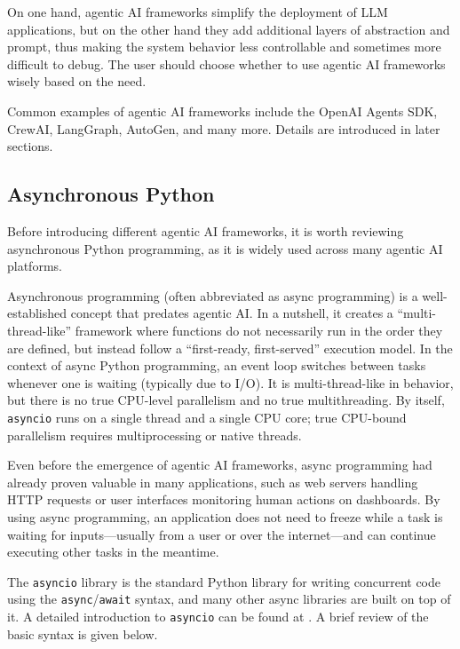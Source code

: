 On one hand, agentic AI frameworks simplify the deployment of LLM applications, but on the other hand they add additional layers of abstraction and prompt, thus making the system behavior less controllable and sometimes more difficult to debug. The user should choose whether to use agentic AI frameworks wisely based on the need.

Common examples of agentic AI frameworks include the OpenAI Agents SDK, CrewAI, LangGraph, AutoGen, and many more. Details are introduced in later sections.

\subsection{Asynchronous Python}

Before introducing different agentic AI frameworks, it is worth reviewing asynchronous Python programming, as it is widely used across many agentic AI platforms.

Asynchronous programming (often abbreviated as async programming) is a well-established concept that predates agentic AI. In a nutshell, it creates a ``multi-thread-like'' framework where functions do not necessarily run in the order they are defined, but instead follow a ``first-ready, first-served'' execution model. In the context of async Python programming, an event loop switches between tasks whenever one is waiting (typically due to I/O). It is multi-thread-like in behavior, but there is no true CPU-level parallelism and no true multithreading. By itself, \verb|asyncio| runs on a single thread and a single CPU core; true CPU-bound parallelism requires multiprocessing or native threads.

Even before the emergence of agentic AI frameworks, async programming had already proven valuable in many applications, such as web servers handling HTTP requests or user interfaces monitoring human actions on dashboards. By using async programming, an application does not need to freeze while a task is waiting for inputs—usually from a user or over the internet—and can continue executing other tasks in the meantime.

The \verb|asyncio| library is the standard Python library for writing concurrent code using the \verb|async|/\verb|await| syntax, and many other async libraries are built on top of it. A detailed introduction to \verb|asyncio| can be found at \cite{python2025asyncio}. A brief review of the basic syntax is given below.

